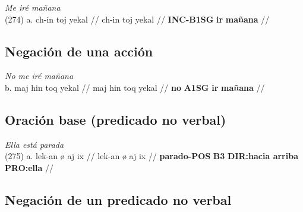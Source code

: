 \documentclass{article}%
\begin{document}
%
\par\medskip%
\ex
\textit{Me iré mañana} \\
\begingl
\gla (274) a. ch-in toj yekal //
\glb ch-in toj yekal //
\glc \textbf{INC-}\textbf{B1SG} \textbf{ir} \textbf{mañana} //
\endgl
\xe
%
\medskip%
\subsection{Negación de una acción}%
\label{subsec:Negacindeunaaccin}%

%
\par\medskip%
\ex
\textit{No me iré mañana} \\
\begingl
\gla b. maj hin toq yekal //
\glb maj hin toq yekal //
\glc \textbf{no} \textbf{A1SG} \textbf{ir} \textbf{mañana} //
\endgl
\xe
%
\medskip%
\subsection{Oración base (predicado no verbal)}%
\label{subsec:Oracinbase(predicadonoverbal)}%

%
\par\medskip%
\ex
\textit{Ella está parada} \\
\begingl
\gla (275) a. lek-an ø aj ix //
\glb lek-an ø aj ix //
\glc \textbf{parado-}\textbf{POS} \textbf{B3} \textbf{DIR:hacia arriba} \textbf{PRO:ella} //
\endgl
\xe
%
\medskip%
\subsection{Negación de un predicado no verbal}%
\label{subsec:Negacindeunpredicadonoverbal}%

%
\end{document}
